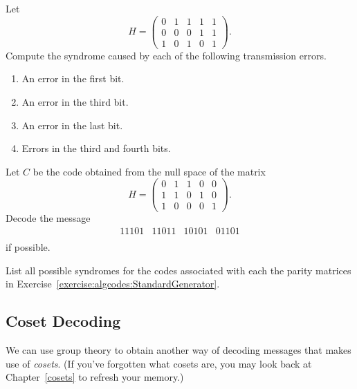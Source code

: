  \begin{exercise}{}
Let
\[
H =
\left(
\begin{array}{ccccc}
0 & 1 & 1 & 1 & 1 \\
0 & 0 & 0 & 1 & 1 \\
1 & 0 & 1 & 0 & 1
\end{array}
\right).
\]
Compute the syndrome caused by each of the following transmission
errors. 
\begin{enumerate}
 
 \bf\item\rm 
An error in the first bit.
 
 \bf\item\rm 
An error in the third bit.
 
 \bf\item\rm 
An error in the last bit.
 
 \bf\item\rm 
Errors in the third and fourth bits.
 
\end{enumerate}
 \end{exercise}
 
\begin{exercise}{}
Let $C$ be the code obtained from the null space of the matrix
\[
H =
\left(
\begin{array}{ccccc}
0 & 1 & 1 & 0 & 0 \\
1 & 1 & 0 & 1 & 0 \\
1 & 0 & 0 & 0 & 1
\end{array}
\right).
\]
Decode the message
\[
\begin{array}{cccc}
11101 & 11011 & 10101 & 01101  \\
\end{array}
\]
if possible.
\end{exercise}
 
  
\begin{exercise}{}
List all possible syndromes for the codes associated with each the parity
matrices in Exercise~\ref{exercise:algcodes:StandardGenerator}. 
\end{exercise} 
 
\subsection{Coset Decoding}
 
 
We can use group theory to obtain another way of decoding messages that makes use of \emph{cosets}. (If you've 
forgotten what cosets are, you may look back at Chapter~\ref{cosets} to refresh your memory.) 

